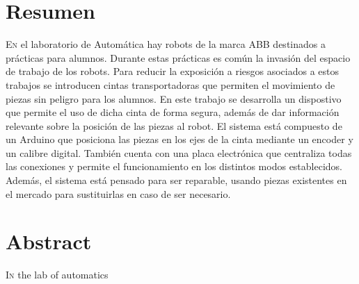 \chapter*{Resumen}
\pagestyle{especial}
{}

\lettrine[lraise=-0.1, lines=2, loversize=0.2]{E}n el laboratorio de Automática
hay robots de la marca ABB destinados a prácticas para alumnos. Durante estas 
prácticas es común la invasión del espacio de trabajo de los robots. Para reducir 
la exposición a riesgos asociados a estos trabajos se introducen cintas transportadoras
que permiten el movimiento de piezas sin peligro para los alumnos. En este trabajo
se desarrolla un dispostivo que permite el uso de dicha cinta de forma segura, 
además de dar información relevante sobre la posición de las piezas al robot.
El sistema está compuesto de un Arduino que posiciona las piezas en los ejes de la cinta
mediante un encoder y un calibre digital. También cuenta con una placa electrónica que
centraliza todas las conexiones y permite el funcionamiento en los distintos modos establecidos.
Además, el sistema está pensado para ser reparable, usando piezas existentes en el 
mercado para sustituirlas en caso de ser necesario.



\chapter*{Abstract}
\pagestyle{especial}
{}

\lettrine[lraise=-0.1, lines=2, loversize=0.2]{I}{n} the lab of automatics